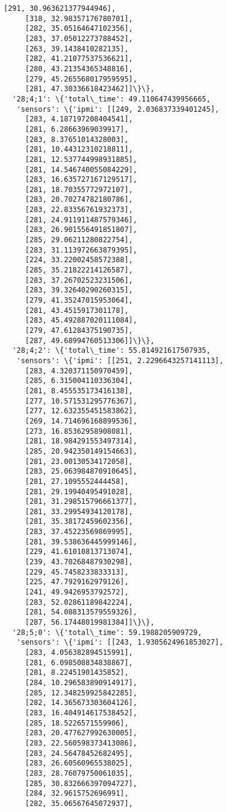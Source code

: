 \documentclass[11pt]{article}
\begin{document}
\begin{tcolorbox}[breakable, size=fbox, boxrule=.5pt, pad at break*=1mm, opacityfill=0]
\begin{Verbatim}[commandchars=\\\{\}]
     [291, 30.963621377944946],
     [318, 32.98357176780701],
     [282, 35.05164647102356],
     [283, 37.05012273788452],
     [263, 39.1438410282135],
     [282, 41.21077537536621],
     [280, 43.21354365348816],
     [279, 45.265568017959595],
     [281, 47.30336618423462]]\}\},
  '28;4;1': \{'total\_time': 49.110647439956665,
   'sensors': \{'ipmi': [[249, 2.036837339401245],
     [283, 4.187197208404541],
     [281, 6.28663969039917],
     [283, 8.37651014328003],
     [281, 10.44312310218811],
     [281, 12.537744998931885],
     [281, 14.546740055084229],
     [283, 16.635727167129517],
     [281, 18.70355772972107],
     [283, 20.70274782180786],
     [283, 22.83356761932373],
     [281, 24.911911487579346],
     [283, 26.901556491851807],
     [285, 29.06211280822754],
     [283, 31.113972663879395],
     [224, 33.22002458572388],
     [285, 35.21822214126587],
     [283, 37.26702523231506],
     [283, 39.32640290260315],
     [279, 41.35247015953064],
     [281, 43.4515917301178],
     [283, 45.492887020111084],
     [279, 47.61284375190735],
     [287, 49.68994760513306]]\}\},
  '28;4;2': \{'total\_time': 55.814921617507935,
   'sensors': \{'ipmi': [[251, 2.2296643257141113],
     [283, 4.320371150970459],
     [285, 6.315004110336304],
     [281, 8.455535173416138],
     [277, 10.571531295776367],
     [277, 12.632355451583862],
     [269, 14.714696168899536],
     [273, 16.85362958908081],
     [281, 18.984291553497314],
     [285, 20.942350149154663],
     [281, 23.00130534172058],
     [283, 25.063984870910645],
     [281, 27.1095552444458],
     [281, 29.19940495491028],
     [281, 31.298515796661377],
     [281, 33.29954934120178],
     [281, 35.38172459602356],
     [283, 37.45223569869995],
     [281, 39.538636445999146],
     [229, 41.61010813713074],
     [239, 43.70268487930298],
     [229, 45.7458233833313],
     [225, 47.7929162979126],
     [241, 49.9426953792572],
     [283, 52.02861189842224],
     [281, 54.088313579559326],
     [287, 56.17448019981384]]\}\},
  '28;5;0': \{'total\_time': 59.1988205909729,
   'sensors': \{'ipmi': [[243, 1.9305624961853027],
     [283, 4.056382894515991],
     [281, 6.098508834838867],
     [281, 8.22451901435852],
     [284, 10.296583890914917],
     [285, 12.348259925842285],
     [282, 14.365673303604126],
     [283, 16.404914617538452],
     [285, 18.5226571559906],
     [283, 20.477627992630005],
     [283, 22.560598373413086],
     [283, 24.56478452682495],
     [283, 26.60560965538025],
     [283, 28.76079750061035],
     [285, 30.832666397094727],
     [284, 32.9615752696991],
     [282, 35.06567645072937],

\end{Verbatim}
\end{tcolorbox}
\end{document}
